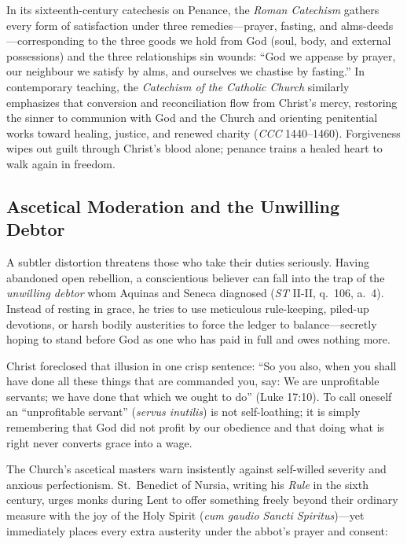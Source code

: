 In its sixteenth-century catechesis on Penance, the \emph{Roman Catechism} gathers every form of satisfaction under three remedies---prayer, fasting, and alms-deeds---corresponding to the three goods we hold from God (soul, body, and external possessions) and the three relationships sin wounds: ``God we appease by prayer, our neighbour we satisfy by alms, and ourselves we chastise by fasting.'' In contemporary teaching, the \emph{Catechism of the Catholic Church} similarly emphasizes that conversion and reconciliation flow from Christ's mercy, restoring the sinner to communion with God and the Church and orienting penitential works toward healing, justice, and renewed charity (\emph{CCC} 1440--1460). Forgiveness wipes out guilt through Christ's blood alone; penance trains a healed heart to walk again in freedom.

\subsection{Ascetical Moderation and the Unwilling Debtor}

A subtler distortion threatens those who take their duties seriously. Having abandoned open rebellion, a conscientious believer can fall into the trap of the \emph{unwilling debtor} whom Aquinas and Seneca diagnosed (\emph{ST} II-II, q.\ 106, a.\ 4). Instead of resting in grace, he tries to use meticulous rule-keeping, piled-up devotions, or harsh bodily austerities to force the ledger to balance---secretly hoping to stand before God as one who has paid in full and owes nothing more.

Christ foreclosed that illusion in one crisp sentence: ``So you also, when you shall have done all these things that are commanded you, say: We are unprofitable servants; we have done that which we ought to do'' (Luke 17:10). To call oneself an ``unprofitable servant'' (\emph{servus inutilis}) is not self-loathing; it is simply remembering that God did not profit by our obedience and that doing what is right never converts grace into a wage.

The Church's ascetical masters warn insistently against self-willed severity and anxious perfectionism. St.\ Benedict of Nursia, writing his \emph{Rule} in the sixth century, urges monks during Lent to offer something freely beyond their ordinary measure with the joy of the Holy Spirit (\emph{cum gaudio Sancti Spiritus})---yet immediately places every extra austerity under the abbot's prayer and consent:

